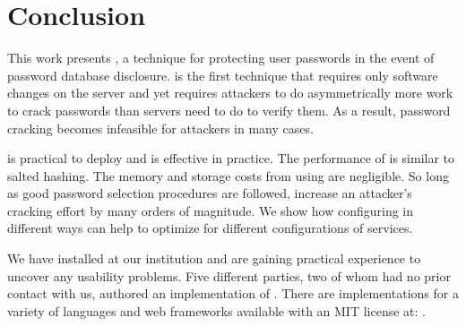 \section{Conclusion}
\label{SEC:conclusion}

This work presents \PPH, a technique for protecting user passwords in the 
event of password database disclosure. \PPH is the first technique
that requires only software changes on the server and yet requires
attackers to do asymmetrically more work to crack passwords than
servers need to do to verify them.  As a result, password
cracking becomes infeasible for attackers in many cases.


\PPH is practical to deploy and is effective in practice.  The performance
of \PPH is similar to salted hashing.  The memory and storage costs from
using \PPH are negligible.  So long as good password selection procedures
are followed, \thresholdaccounts increase an attacker's cracking effort by
many orders of magnitude.  We show how configuring \partialverification
in different ways can help to optimize \PPH for different configurations
of services.

We have installed \PPH at our institution and are gaining practical
experience to uncover any usability problems.  Five different parties, 
two of whom had no prior contact with us, authored an implementation
of \PPH.  There are implementations for a variety of languages and 
web frameworks available with an MIT license at:
\showurlx. 


